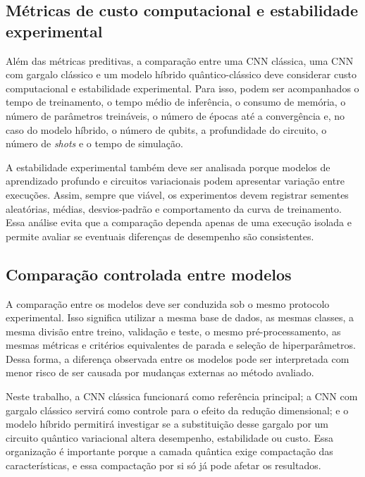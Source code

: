 \documentclass[
    12pt,
    openright,
    oneside,
    a4paper,
    english,
    brazil
]{abntex2}
\begin{document}
\subsection{Métricas de custo computacional e estabilidade experimental}
\label{subsec:metricas_custo_estabilidade}

Além das métricas preditivas, a comparação entre uma CNN clássica, uma CNN com gargalo clássico e um modelo híbrido quântico-clássico deve considerar custo computacional e estabilidade experimental. Para isso, podem ser acompanhados o tempo de treinamento, o tempo médio de inferência, o consumo de memória, o número de parâmetros treináveis, o número de épocas até a convergência e, no caso do modelo híbrido, o número de qubits, a profundidade do circuito, o número de \textit{shots} e o tempo de simulação.

A estabilidade experimental também deve ser analisada porque modelos de aprendizado profundo e circuitos variacionais podem apresentar variação entre execuções. Assim, sempre que viável, os experimentos devem registrar sementes aleatórias, médias, desvios-padrão e comportamento da curva de treinamento. Essa análise evita que a comparação dependa apenas de uma execução isolada e permite avaliar se eventuais diferenças de desempenho são consistentes.

\subsection{Comparação controlada entre modelos}
\label{subsec:comparacao_controlada_modelos}

A comparação entre os modelos deve ser conduzida sob o mesmo protocolo experimental. Isso significa utilizar a mesma base de dados, as mesmas classes, a mesma divisão entre treino, validação e teste, o mesmo pré-processamento, as mesmas métricas e critérios equivalentes de parada e seleção de hiperparâmetros. Dessa forma, a diferença observada entre os modelos pode ser interpretada com menor risco de ser causada por mudanças externas ao método avaliado.

Neste trabalho, a CNN clássica funcionará como referência principal; a CNN com gargalo clássico servirá como controle para o efeito da redução dimensional; e o modelo híbrido permitirá investigar se a substituição desse gargalo por um circuito quântico variacional altera desempenho, estabilidade ou custo. Essa organização é importante porque a camada quântica exige compactação das características, e essa compactação por si só já pode afetar os resultados.
\end{document}
